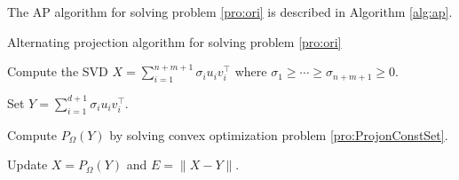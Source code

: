 \documentclass[smallextended, envcountsame]{svjour3}
\begin{document}
    The AP algorithm for solving problem \eqref{pro:ori} is described in Algorithm \ref{alg:ap}.
    \begin{algorithm}[!htb]\caption{Alternating projection algorithm for solving problem \eqref{pro:ori}}\label{alg:ap}
    \DontPrintSemicolon
        
        {  
            Compute the SVD $X=\sum\limits_{i=1}^{n+m+1}\sigma_iu_iv_i^\top$ where $\sigma_1\ge\cdots\ge\sigma_{n+m+1}\ge 0$.
            
            Set $Y=\sum\limits_{i=1}^{d+1}\sigma_iu_iv_i^\top$.
            
            Compute $P_\Omega(Y)$ by solving convex optimization problem \eqref{pro:ProjonConstSet}.

            Update $X=P_\Omega(Y)$ and $E=\|X-Y\|$.
        }
    \end{algorithm}
\end{document}
